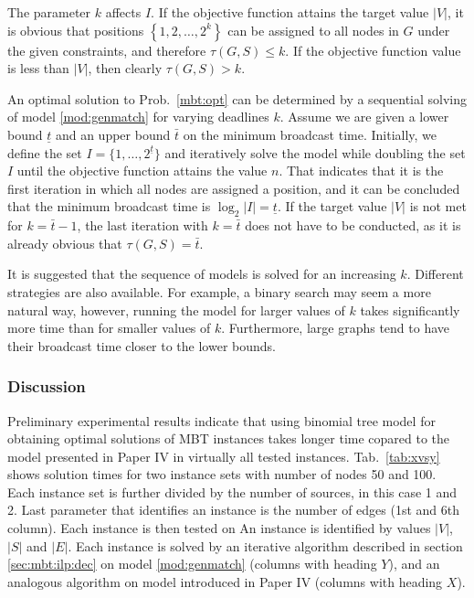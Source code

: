 The parameter $k$ affects $I$.
If the objective function attains the target value $|V|$, 
it is obvious that positions $\left\{1,2,\dots,2^k\right\}$ can be assigned to all nodes in $G$ under the given constraints, and therefore $\tau(G,S)\leq k$.
If the objective function value is less than $|V|$, then clearly $\tau(G,S)>k$.

An optimal solution to Prob.~\ref{mbt:opt} can be determined by a sequential solving of model \eqref{mod:genmatch} for varying deadlines $k$.
Assume we are given a lower bound $\underline{t}$ and an upper bound $\bar{t}$ on the minimum broadcast time.
Initially, we define the set $I=\{1,\dots,2^{\underline{t}}\}$ and iteratively solve the model while doubling the set $I$ until the objective function attains the value $n$.
That indicates that it is the first iteration in which all nodes are assigned a position, and it can be concluded that the minimum broadcast time is $\log_2|I|=\underline{t}$.
If the target value $|V|$ is not met for $k=\bar{t}-1$, the last iteration with $k=\bar{t}$ does not have to be conducted, as it is already obvious that $\tau(G,S)=\bar{t}$.

It is suggested that the sequence of models is solved for an increasing $k$. 
Different strategies are also available. 
For example, a binary search may seem a more natural way, however, running the model for larger values of $k$ takes significantly more time than for smaller values of $k$.
Furthermore, large graphs tend to have their broadcast time closer to the lower bounds.

\subsubsection{Discussion}

Preliminary experimental results indicate that using binomial tree model for obtaining optimal solutions of MBT instances 
takes longer time copared to the model presented in Paper IV in virtually all tested instances. 
Tab.~\ref{tab:xvsy} shows solution times for two instance sets with number of nodes 50 and 100.
Each instance set is further divided by the number of sources, in this case 1 and 2.
Last parameter that identifies an instance is the number of edges (1st and 6th column).
Each instance is then tested on 
An instance is identified by values $|V|$, $|S|$ and $|E|$.
Each instance is solved by an iterative algorithm described in section \ref{sec:mbt:ilp:dec} on model \eqref{mod:genmatch}
(columns with heading $Y$), and an analogous algorithm on model introduced in Paper IV (columns with heading $X$).

